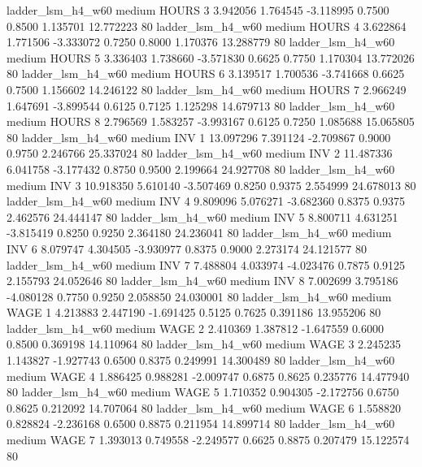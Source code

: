      ladder_lsm_h4_w60     medium    HOURS                 3  3.942056 1.764545 -3.118995 0.7500 0.8500  1.135701   12.772223 80
     ladder_lsm_h4_w60     medium    HOURS                 4  3.622864 1.771506 -3.333072 0.7250 0.8000  1.170376   13.288779 80
     ladder_lsm_h4_w60     medium    HOURS                 5  3.336403 1.738660 -3.571830 0.6625 0.7750  1.170304   13.772026 80
     ladder_lsm_h4_w60     medium    HOURS                 6  3.139517 1.700536 -3.741668 0.6625 0.7500  1.156602   14.246122 80
     ladder_lsm_h4_w60     medium    HOURS                 7  2.966249 1.647691 -3.899544 0.6125 0.7125  1.125298   14.679713 80
     ladder_lsm_h4_w60     medium    HOURS                 8  2.796569 1.583257 -3.993167 0.6125 0.7250  1.085688   15.065805 80
     ladder_lsm_h4_w60     medium      INV                 1 13.097296 7.391124 -2.709867 0.9000 0.9750  2.246766   25.337024 80
     ladder_lsm_h4_w60     medium      INV                 2 11.487336 6.041758 -3.177432 0.8750 0.9500  2.199664   24.927708 80
     ladder_lsm_h4_w60     medium      INV                 3 10.918350 5.610140 -3.507469 0.8250 0.9375  2.554999   24.678013 80
     ladder_lsm_h4_w60     medium      INV                 4  9.809096 5.076271 -3.682360 0.8375 0.9375  2.462576   24.444147 80
     ladder_lsm_h4_w60     medium      INV                 5  8.800711 4.631251 -3.815419 0.8250 0.9250  2.364180   24.236041 80
     ladder_lsm_h4_w60     medium      INV                 6  8.079747 4.304505 -3.930977 0.8375 0.9000  2.273174   24.121577 80
     ladder_lsm_h4_w60     medium      INV                 7  7.488804 4.033974 -4.023476 0.7875 0.9125  2.155793   24.052646 80
     ladder_lsm_h4_w60     medium      INV                 8  7.002699 3.795186 -4.080128 0.7750 0.9250  2.058850   24.030001 80
     ladder_lsm_h4_w60     medium     WAGE                 1  4.213883 2.447190 -1.691425 0.5125 0.7625  0.391186   13.955206 80
     ladder_lsm_h4_w60     medium     WAGE                 2  2.410369 1.387812 -1.647559 0.6000 0.8500  0.369198   14.110964 80
     ladder_lsm_h4_w60     medium     WAGE                 3  2.245235 1.143827 -1.927743 0.6500 0.8375  0.249991   14.300489 80
     ladder_lsm_h4_w60     medium     WAGE                 4  1.886425 0.988281 -2.009747 0.6875 0.8625  0.235776   14.477940 80
     ladder_lsm_h4_w60     medium     WAGE                 5  1.710352 0.904305 -2.172756 0.6750 0.8625  0.212092   14.707064 80
     ladder_lsm_h4_w60     medium     WAGE                 6  1.558820 0.828824 -2.236168 0.6500 0.8875  0.211954   14.899714 80
     ladder_lsm_h4_w60     medium     WAGE                 7  1.393013 0.749558 -2.249577 0.6625 0.8875  0.207479   15.122574 80
